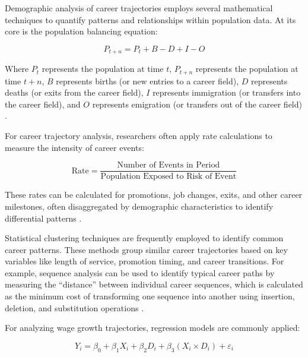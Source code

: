 \documentclass[../main.tex]{subfiles}
\begin{document}
Demographic analysis of career trajectories employs several mathematical techniques to quantify patterns and relationships within population data. At its core is the population balancing equation:

\begin{equation}

P_{t+n} = P_t + B - D + I - O

\end{equation}

Where $P_t$ represents the population at time $t$, $P_{t+n}$ represents the population at time $t+n$, $B$ represents births (or new entries to a career field), $D$ represents deaths (or exits from the career field), $I$ represents immigration (or transfers into the career field), and $O$ represents emigration (or transfers out of the career field) \citep{land2019mathematical, vanwissen2016dissertation}.

For career trajectory analysis, researchers often apply rate calculations to measure the intensity of career events:

\begin{equation}

\text{Rate} = \frac{\text{Number of Events in Period}}{\text{Population Exposed to Risk of Event}}

\end{equation}

These rates can be calculated for promotions, job changes, exits, and other career milestones, often disaggregated by demographic characteristics to identify differential patterns \citep{gale2024demographics, land2019mathematical}.

Statistical clustering techniques are frequently employed to identify common career patterns. These methods group similar career trajectories based on key variables like length of service, promotion timing, and career transitions. For example, sequence analysis can be used to identify typical career paths by measuring the ``distance'' between individual career sequences, which is calculated as the minimum cost of transforming one sequence into another using insertion, deletion, and substitution operations \citep{nataraj2018career}.

For analyzing wage growth trajectories, regression models are commonly applied:

\begin{equation}

Y_i = \beta_0 + \beta_1 X_i + \beta_2 D_i + \beta_3 (X_i \times D_i) + \varepsilon_i

\end{equation}
\end{document}
